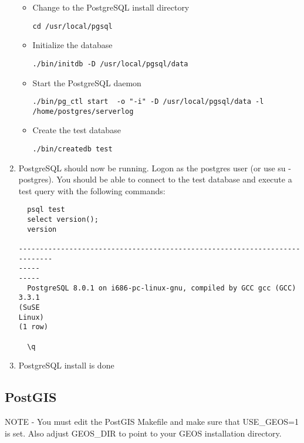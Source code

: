 \begin{enumerate}
\begin{itemize}
\item Change to the PostgreSQL install directory 
\begin{verbatim}
cd /usr/local/pgsql
\end{verbatim}

\item Initialize the database 
\begin{verbatim}
./bin/initdb -D /usr/local/pgsql/data
\end{verbatim}

\item Start the PostgreSQL daemon 
\small
\begin{verbatim}
./bin/pg_ctl start  -o "-i" -D /usr/local/pgsql/data -l
/home/postgres/serverlog 
\end{verbatim} 
  
\item Create the test database
\begin{verbatim}
./bin/createdb test
\end{verbatim}
\normalsize
\end{itemize}
\item PostgreSQL should now be running. Logon as the postgres user (or
use su - postgres). You should be able to connect to the test database and
execute a test query with the following commands: 

\begin{verbatim}
  psql test
  select version();
  version
 
---------------------------------------------------------------------------
-----
-----
  PostgreSQL 8.0.1 on i686-pc-linux-gnu, compiled by GCC gcc (GCC) 3.3.1
(SuSE
Linux)
(1 row)

  \q
\end{verbatim}


\item PostgreSQL install is done
\end{enumerate}

\subsection{PostGIS}\label{label_postgis_source}

NOTE - You must edit the PostGIS Makefile and make sure that USE\_GEOS=1
is set. Also adjust GEOS\_DIR to point to your GEOS installation directory.
  
